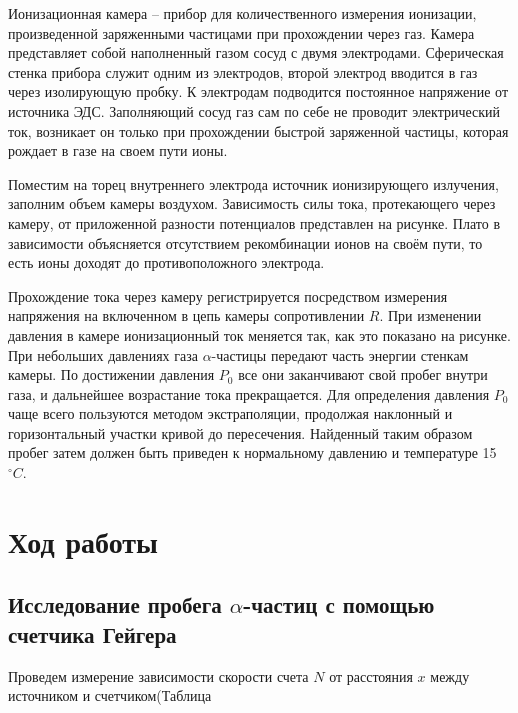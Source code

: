 \documentclass{article}
\begin{document}
    Ионизационная камера -- прибор для количественного измерения ионизации, произведенной заряженными частицами при прохождении
    через газ. Камера представляет собой наполненный газом сосуд с двумя электродами. Сферическая стенка прибора служит одним из электродов, второй электрод вводится в газ через изолирующую пробку. К электродам подводится постоянное напряжение от источника ЭДС.
    Заполняющий сосуд газ сам по себе не проводит электрический ток, возникает он только при прохождении быстрой заряженной частицы, которая
    рождает в газе на своем пути ионы.

    Поместим на торец внутреннего электрода источник ионизирующего излучения, заполним объем камеры воздухом. Зависимость силы тока, протекающего через камеру, от приложенной разности потенциалов представлен на рисунке. Плато в зависимости объясняется отсутствием рекомбинации ионов на своём пути, то есть ионы доходят до противоположного электрода.

    Прохождение тока через камеру регистрируется посредством измерения напряжения на включенном в цепь камеры сопротивлении $R$. При изменении давления в камере ионизационный ток меняется так, как это показано на рисунке. При небольших давлениях газа $\alpha$-частицы передают часть энергии стенкам камеры. По достижении давления $P_0$ все они заканчивают свой пробег внутри газа, и дальнейшее возрастание тока прекращается. Для определения давления $P_0$ чаще всего пользуются методом экстраполяции, продолжая наклонный и горизонтальный участки кривой до пересечения. Найденный таким образом пробег затем должен быть приведен к нормальному давлению и температуре 15 $^\circ C$.


\section{Ход работы}




\subsection{Исследование пробега $\alpha$-частиц с помощью счетчика Гейгера}
	
Проведем измерение зависимости скорости счета $N$ от расстояния $x$ между источником и счетчиком(Таблица %
\end{document}
